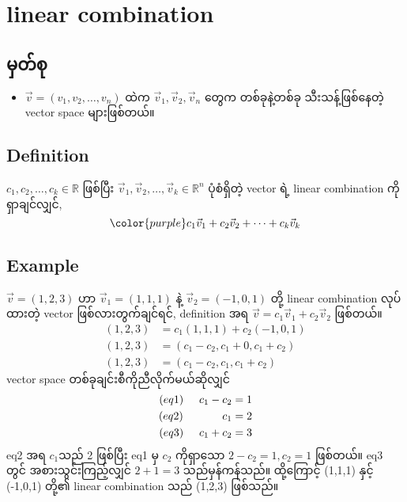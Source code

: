 \section{linear combination}
\subsection{မှတ်စု}
\begin{itemize}
    \item $\vec{v}=(v_1,v_2,\dots,v_n)$ ထဲက $\vec{v}_1, \vec{v}_2, \vec{v}_n$ တွေက တစ်ခုနဲ့တစ်ခု သီးသန့်ဖြစ်နေတဲ့ vector space များဖြစ်တယ်။
\end{itemize}
\subsection{Definition}
$c_1,c_2,\dots,c_k\in\mathbb{R}$ ဖြစ်ပြီး $\vec{v}_1,\vec{v}_2,\dots,\vec{v}_k\in\mathbb{R}^n$ ပုံစံရှိတဲ့ vector ရဲ့ linear combination ကိုရှာချင်လျှင်,
\begin{equation}
    {\color{purple} c_1\vec{v}_1+c_2\vec{v}_2+\dots+c_k\vec{v}_k}
    \label{eq:linear-combination}
\end{equation}
\subsection{Example}
$\vec{v}=(1,2,3)$ ဟာ $\vec{v}_1=(1,1,1)$ နဲ့ $\vec{v}_2=(-1,0,1)$ တို့ linear combination လုပ်ထားတဲ့ vector ဖြစ်လားတွက်ချင်ရင်, definition အရ $\vec{v}=c_1\vec{v}_1+c_2\vec{v}_2$ ဖြစ်တယ်။
\[
    \begin{split}
        (1,2,3) & =c_1(1,1,1)+c_2(-1,0,1)  \\
        (1,2,3) & =(c_1-c_2,c_1+0,c_1+c_2) \\
        (1,2,3) & =(c_1-c_2,c_1,c_1+c_2)
    \end{split}
\]
vector space တစ်ခုချင်းစီကိုညီလိုက်မယ်ဆိုလျှင်
\[
    \begin{split}
        (eq1)\hspace{5mm}c_1-c_2 & =1 \\
        (eq2)\hspace{12.5mm}c_1     & =2 \\
        (eq3)\hspace{5mm}c_1+c_2 & =3
    \end{split}
\]
eq2 အရ $c_1$သည် 2 ဖြစ်ပြီး eq1 မှ $c_2$ ကိုရှာသော $2-c_2=1, c_2=1$ ဖြစ်တယ်။ eq3 တွင် အစားသွင်းကြည့်လျှင် $2+1=3$ သည်မှန်ကန်သည်။ ထို့ကြောင့် (1,1,1) နှင့် (-1,0,1) တို့၏ linear combination သည် (1,2,3) ဖြစ်သည်။

